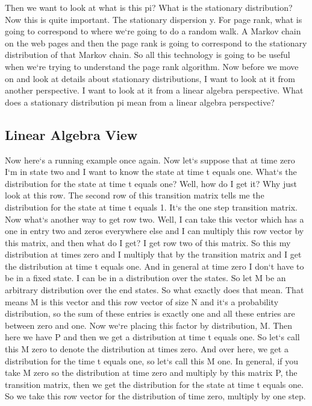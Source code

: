 Then we want to look at what is this pi? What is the stationary distribution? Now this is quite important.
The stationary dispersion y.
For page rank, what is going to correspond to where we`re going to do a random walk.
A Markov chain on the web pages and then the page rank is going to correspond to the stationary distribution of that Markov chain.
So all this technology is going to be useful when we`re trying to understand the page rank algorithm.
Now before we move on and look at details about stationary distributions, I want to look at it from another perspective.
I want to look at it from a linear algebra perspective.
What does a stationary distribution pi mean from a linear algebra perspective?

\subsection{Linear Algebra View}
Now here`s a running example once again.
Now let`s suppose that at time zero I`m in state two and I want to know the state at time t equals one.
What`s the distribution for the state at time t equals one? Well, how do I get it? Why just look at this row.
The second row of this transition matrix tells me the distribution for the state at time t equals 1.
It`s the one step transition matrix.
Now what`s another way to get row two.
Well, I can take this vector which has a one in entry two and zeros everywhere else and I can multiply this row vector by this matrix, and then what do I get? I get row two of this matrix.
So this my distribution at times zero and I multiply that by the transition matrix and I get the distribution at time t equals one.
And in general at time zero I don`t have to be in a fixed state.
I can be in a distribution over the states.
So let M be an arbitrary distribution over the end states.
So what exactly does that mean.
That means M is this vector and this row vector of size N and it`s a probability distribution, so the sum of these entries is exactly one and all these entries are between zero and one.
Now we`re placing this factor by distribution, M\@.
Then here we have P and then we get a distribution at time t equals one.
So let`s call this M zero to denote the distribution at times zero.
And over here, we get a distribution for the time t equals one, so let`s call this M one.
In general, if you take M zero so the distribution at time zero and multiply by this matrix P, the transition matrix, then we get the distribution for the state at time t equals one.
So we take this row vector for the distribution of time zero, multiply by one step.
